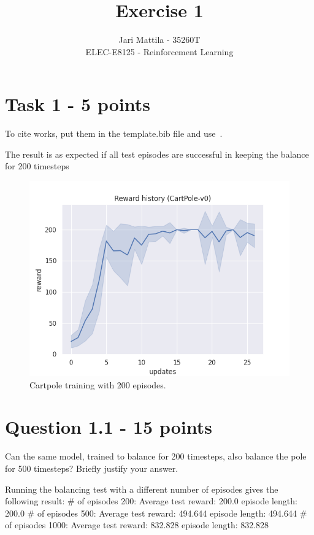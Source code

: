 \documentclass[12pt]{article}
\begin{document}
 
\title{Exercise 1}
\author{Jari Mattila - 35260T\\
ELEC-E8125 - Reinforcement Learning}

\maketitle
\section*{Task 1 - 5 points}

To cite works, put them in the template.bib file and use~\cite{sutton2018reinforcement}.
\newline

\noindent  
The result is as expected if all test episodes are successful in keeping the balance for 200 timesteps   


\begin{figure}[h] 
	\centering  %
    \includegraphics[width=0.9\columnwidth]{img/Figure_task1.png}
	\caption{Cartpole training with 200 episodes.}
	\label{fig:fig1}
\end{figure}


\section*{Question 1.1 - 15 points}

Can the same model, trained to balance for 200 timesteps, also balance the pole for 500 timesteps? Briefly justify your answer.
\newline

\noindent
Running the balancing test with a different number of episodes gives the following result:  
\newline
\indent
\# of episodes 200: Average test reward: 200.0 episode length: 200.0
\newline
\indent
\# of episodes 500: Average test reward: 494.644 episode length: 494.644
\newline
\indent
\# of episodes 1000: Average test reward: 832.828 episode length: 832.828
\newline
\end{document}
